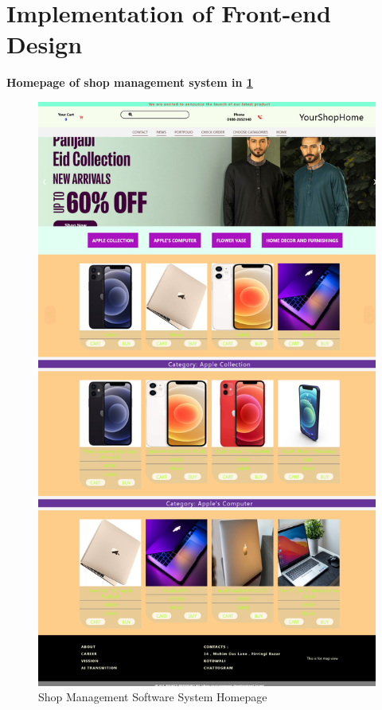 \section{Implementation of Front-end Design}

\textbf{Homepage of shop management system in \ref{fig:fig 6.2.1}}\\[1cm]

\begin{figure}[ht]
    \centering  
    \includegraphics[width=\textwidth, height=0.7\textheight]{designs/Screenshot 2023-06-17 at 14-03-17 Shop management project created by Reshma Dev and Sadia chowdhury.png}    
    \caption{Shop Management Software System Homepage}
    \label{fig:fig 6.2.1}
\end{figure}

